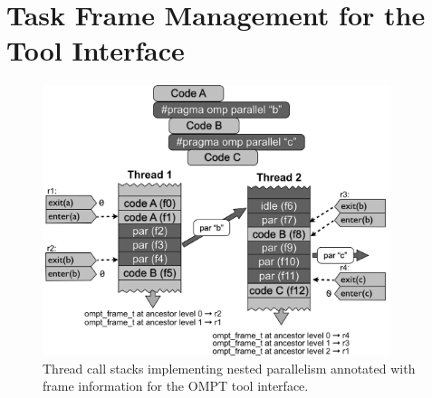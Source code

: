 %
%
%
%
%
%
%
%
%
%


\chapter{Task Frame Management for the Tool Interface}
\label{chap:frames}


   \begin{figure}[h]
    \centering
        \includegraphics[width=4in]{callstack-cropped.pdf}
    \caption{Thread call stacks implementing nested parallelism
      annotated with frame information for the OMPT tool interface.}
    \label{fig:frame}
\end{figure}

